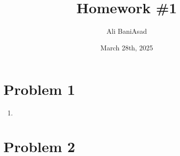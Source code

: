 \documentclass[12]{fphw}
\title{Homework \#1} %
\author{Ali BaniAsad} %
\date{March 28th, 2025} %
\institute{Sharif University of Technology \\ Institute of Aerospace} %
\begin{document}
	
	\maketitle %
	\section*{Problem 1}
	\begin{enumerate}[label=(\alph*)]
		\item 
		\newpage
	\end{enumerate}
	\section*{Problem 2}
\end{document}
